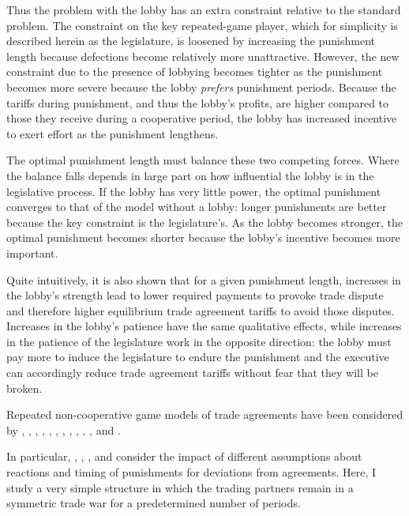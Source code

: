 \documentclass[authoryear, review]{elsarticle}
\begin{document}
Thus the problem with the lobby has an extra constraint relative to the standard problem. The constraint on the key repeated-game player, which for simplicity is described herein as the legislature, is loosened by increasing the punishment length because defections become relatively more unattractive. However, the new constraint due to the presence of lobbying becomes tighter as the punishment becomes more severe because the lobby \textit{prefers} punishment periods. Because the tariffs during punishment, and thus the lobby's profits, are higher compared to those they receive during a cooperative period, the lobby has increased incentive to exert effort as the punishment lengthens.

The optimal punishment length must balance these two competing forces. Where the balance falls depends in large part on how influential the lobby is in the legislative process. If the lobby has very little power, the optimal punishment converges to that of the model without a lobby: longer punishments are better because the key constraint is the legislature's. As the lobby becomes stronger, the optimal punishment becomes shorter because the lobby's incentive becomes more important.

Quite intuitively, it is also shown that for a given punishment length, increases in the lobby's strength lead to lower required payments to provoke trade dispute and therefore higher equilibrium trade agreement tariffs to avoid those disputes. Increases in the lobby's patience have the same qualitative effects, while increases in the patience of the legislature work in the opposite direction: the lobby must pay more to induce the legislature to endure the punishment and the executive can accordingly reduce trade agreement tariffs without fear that they will be broken.

Repeated non-cooperative game models of trade agreements have been considered by \citet{mcm86,mcm89}, \citet{cotmitch}, \citet{dixit1987}, \citet{bs1990, bs1997a, bs1997b, bs2002}, \citet{kovthurs}, \citet{maggi99}, \citet{ederington}, \citet{ludema2001}, \citet{rosendorff}, \citet{krw}, \citet{bagwell2009}, and \citet{park}.

In particular, \citet{hungerford}, \citet{riezman1991}, \citet{cotmitch}, \citet{bagwell2008} and \citet{martinvergote} consider the impact of different assumptions about reactions and timing of punishments for deviations from agreements. Here, I study a very simple structure in which the trading partners remain in a symmetric trade war for a predetermined number of periods.
\end{document}
